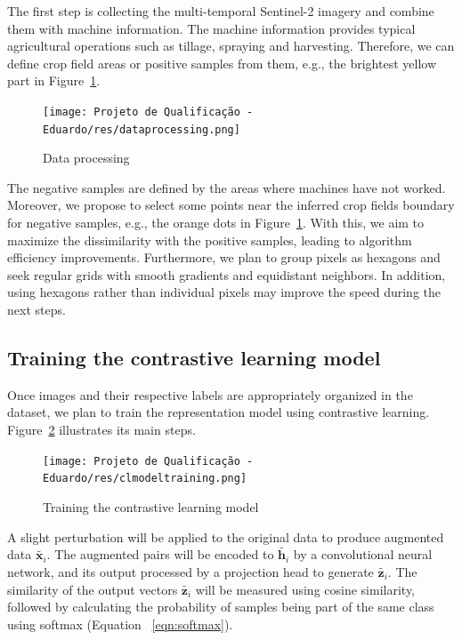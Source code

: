 \documentclass[12pt]{article}
\begin{document}
The first step is collecting the multi-temporal Sentinel-2 imagery and combine them with machine information. The machine information provides typical agricultural operations such as tillage, spraying and harvesting. Therefore, we can define crop field areas or positive samples from them, e.g., the brightest yellow part in Figure~\ref{figure:data_processing}. 

\begin{figure}[ht]
\centering
\texttt{[image: Projeto de Qualificação - Eduardo/res/dataprocessing.png]}
\caption{\label{figure:data_processing}Data processing}
\end{figure}

The negative samples are defined by the areas where machines have not worked. Moreover, we propose to select some points near the inferred crop fields boundary for negative samples, e.g., the orange dots in Figure~\ref{figure:data_processing}. With this, we aim to maximize the dissimilarity with the positive samples, leading to algorithm efficiency improvements. Furthermore, we plan to group pixels as hexagons and seek regular grids with smooth gradients and equidistant neighbors. In addition, using hexagons rather than individual pixels may improve the speed during the next steps.

\subsection{Training the contrastive learning model}\label{subsection:cltraining}

Once images and their respective labels are appropriately organized in the dataset, we plan to train the representation model using contrastive learning. Figure~\ref{figure:contrastive_training} illustrates its main steps.

\begin{figure}[ht]
\centering
\texttt{[image: Projeto de Qualificação - Eduardo/res/clmodeltraining.png]}
\caption{\label{figure:contrastive_training}Training the contrastive learning model}
\end{figure}

A slight perturbation will be applied to the original data to produce augmented data $\tilde{\boldsymbol{x}_i}$. The augmented pairs will be encoded to $\tilde{\boldsymbol{h}_i}$ by a convolutional neural network, and its output processed by a projection head to generate $\tilde{\boldsymbol{z}_i}$. The similarity of the output vectors $\tilde{\boldsymbol{z}_i}$ will be measured using cosine similarity, followed by calculating the probability of samples being part of the same class using softmax (Equation ~\ref{eqn:softmax}).
\end{document}
